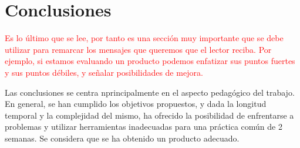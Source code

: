 \documentclass[12pt,letterpaper]{article}
\begin{document}
\section{Conclusiones}
\label{sec:conclusiones}
\textcolor{red}{ Es lo último que se lee, por tanto es una sección muy
  importante que se debe utilizar para remarcar los mensajes que
  queremos que el lector reciba. Por ejemplo, si estamos evaluando un
  producto podemos enfatizar sus puntos fuertes y sus puntos débiles,
  y señalar posibilidades de mejora. }

Las conclusiones se centra nprincipalmente en el aspecto pedagógico
del trabajo.\\ En general, se han cumplido los objetivos propuestos, y
dada la longitud temporal y la complejidad del mismo, ha ofrecido la
posibilidad de enfrentarse a problemas y utilizar herramientas
inadecuadas para una práctica común de 2 semanas. Se considera que se
ha obtenido un producto adecuado.
\end{document}
